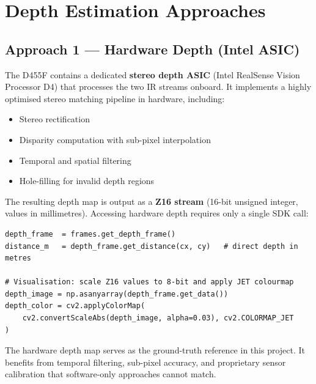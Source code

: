 \documentclass[12pt, a4paper]{article}
\begin{document}
\section{Depth Estimation Approaches}

\subsection{Approach 1 --- Hardware Depth (Intel ASIC)}

The D455F contains a dedicated \textbf{stereo depth ASIC} (Intel RealSense
Vision Processor D4) that processes the two IR streams onboard. It implements a
highly optimised stereo matching pipeline in hardware, including:

\begin{itemize}
  \item Stereo rectification
  \item Disparity computation with sub-pixel interpolation
  \item Temporal and spatial filtering
  \item Hole-filling for invalid depth regions
\end{itemize}

The resulting depth map is output as a \textbf{Z16 stream} (16-bit unsigned
integer, values in millimetres). Accessing hardware depth requires only a single
SDK call:

\begin{lstlisting}[caption={Hardware depth access and visualisation}]
depth_frame  = frames.get_depth_frame()
distance_m   = depth_frame.get_distance(cx, cy)   # direct depth in metres

# Visualisation: scale Z16 values to 8-bit and apply JET colourmap
depth_image = np.asanyarray(depth_frame.get_data())
depth_color = cv2.applyColorMap(
    cv2.convertScaleAbs(depth_image, alpha=0.03), cv2.COLORMAP_JET
)
\end{lstlisting}

\begin{notebox}
The hardware depth map serves as the ground-truth reference in this project. It
benefits from temporal filtering, sub-pixel accuracy, and proprietary sensor
calibration that software-only approaches cannot match.
\end{notebox}

\end{document}
